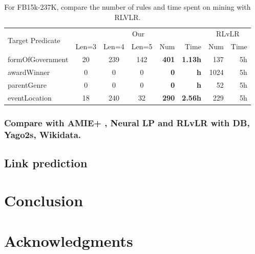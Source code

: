 \documentclass{article}
\begin{document}
	\renewcommand\arraystretch{1.2}
	\begin{table}[htbp]
	\centering
	\caption{For FB15k-237K, compare the number of rules and time spent on mining with RLVLR.}
	\begin{tabular}{ |l|c|c|c|r|r|r|r| }  
		\hline
		\multirow{2}{*}{Target Predicate} & \multicolumn{5}{c|}{Our}     & \multicolumn{2}{c|}{RLvLR} \\ \cline{2-8}
						                  & Len=3&Len=4&Len=5&Num&Time   & Num & Time \\
		\hline
		formOfGovernment & 20 & 239 & 142 & {\bf 401} & {\bf 1.13h}     & 137 & 5h \\
		\hline
		awardWinner & 0 & 0 & 0 &  {\bf 0} & {\bf h}                    & 1024 & 5h \\
		\hline
		parentGenre & 0 & 0 & 0 &  {\bf 0} & {\bf h}                    & 52 & 5h \\
		\hline
		eventLocation & 18 & 240 & 32 & {\bf 290} & {\bf 2.56h}         & 229 & 5h \\
		\hline
	\end{tabular}
	\end{table}
	
	\subsubsection{Compare with AMIE+ , Neural LP and RLvLR with DB, Yago2s, Wikidata.}
	
	\subsection{Link prediction}
	


	\section{Conclusion}
	
	
	\section*{Acknowledgments}
	
	
	
	
	
\end{document}

